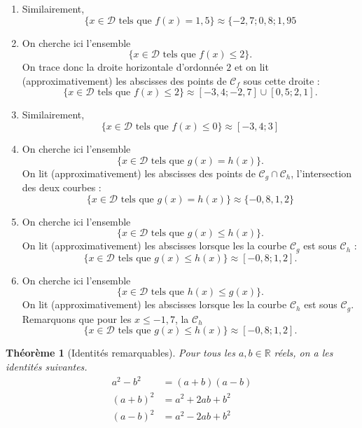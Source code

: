 \documentclass[a4paper, 14pt]{extarticle}
\theoremstyle{plain}
\newtheorem*{theorem*}{Th\'eor\`eme}
\theoremstyle{definition}
\newcommand{\C}{\mathcal{C}}
\newcommand{\R}{\mathbb{R}}
\newcommand{\D}{\mathcal{D}}
\begin{document}
{\begin{enumerate}
			\item Similairement,
				\[ \{ x \in \D \text{ tels que } f(x) = 1,5 \} \approx \{ {-2,7}; {0,8} ; {1,95} \]
				
			\item On cherche ici l'ensemble
				\[ \{ x \in \D \text{ tels que } f(x) \leq 2 \}. \]
			On trace donc la droite horizontale d'ordonnée $2$ et on lit (approximativement) les abscisses des points de $\C_f$ sous cette droite : 
				\[ \{ x \in \D \text{ tels que } f(x) \leq 2 \} \approx [{-3,4} ; {-2,7} ] \cup [ {0,5} ; {2,1} ].  \]
			\item Similairement,
				\[ \{ x \in \D \text{ tels que } f(x) \leq 0 \} \approx [{-3,4} ; {3} ]  \]
			\item On cherche ici l'ensemble
				\[ \{ x \in \D \text{ tels que } g(x) = h(x) \}. \]
			On lit (approximativement) les abscisses des points de $\C_g \cap \C_h$, l'intersection des deux courbes :
				\[ \{ x \in \D \text{ tels que } g(x) = h(x) \} \approx \{ {-0,8}, {1,2} \} \]
			\item On cherche ici l'ensemble
				\[ \{ x \in \D \text{ tels que } g(x) \leq h(x) \}. \]
			On lit (approximativement) les abscisses lorsque les la courbe $\C_g$ est sous $\C_h$ :
				\[ \{ x \in \D \text{ tels que } g(x) \leq h(x) \} \approx [ {-0,8} ; {1,2} ]. \]
			\item On cherche ici l'ensemble
				\[ \{ x \in \D \text{ tels que } h(x) \leq g(x) \}. \]
			On lit (approximativement) les abscisses lorsque les la courbe $\C_h$ est sous $\C_g$.
			Remarquons que pour les $x\leq-1,7$, la $\C_h$
				\[ \{ x \in \D \text{ tels que } g(x) \leq h(x) \} \approx [ {-0,8} ; {1,2} ]. \]
		\end{enumerate}
	
	}
	
	
	\begin{theorem*}[Identités remarquables]
		Pour tous les $a,b\in\R$ réels, on a les identités suivantes.
			\begin{align*}
				a^2 - b^2 &= (a+b)(a-b) \\
				(a+b)^2 &= a^2 + 2ab + b^2 \\
				(a-b)^2 &= a^2 - 2ab + b^2
			\end{align*}
	\end{theorem*}
\end{document}
